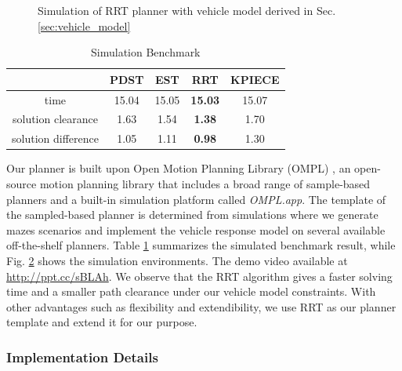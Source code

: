 \documentclass[../thesis.tex]{subfiles}
\begin{document}
\begin{figure}[t]
\begin{subfigure}[b]{0.3\linewidth}
           	\subcaption{}
           	\label{fig:rrt-sim-maze2}
    	\end{subfigure}
    	\caption{Simulation of RRT planner with vehicle model derived in Sec. \ref{sec:vehicle_model}}
	\label{fig:rrt-sim-maze}
\end{figure}
 
 
\begin{table}[t]
    	\centering
    	\caption{Simulation Benchmark}
    	\label{table:simulation-benchmark}
    	\begin{small}
    	\begin{sc}
    	\begin{tabular}{ccccc}
           	\toprule
                   	& PDST \cite{ladd2005motion} & EST \cite{hsu1997path} & RRT \cite{kuffner2000rrt} & KPIECE \cite{csucan2009kinodynamic} \\
           	\midrule \midrule
           	time & 15.04 & 15.05 & \textbf{15.03} & 15.07 \\
           	solution clearance & 1.63 & 1.54 & \textbf{1.38} & 1.70 \\
           	solution difference & 1.05 & 1.11 & \textbf{0.98} & 1.30 \\
           	\toprule
    	\end{tabular}
    	\end{sc}
    	\end{small}
\end{table}
 
Our planner is built upon Open Motion Planning Library (OMPL) \cite{sucan2012the-open-motion-planning-library}, an open-source motion planning library that includes a broad range of sample-based planners and a built-in simulation platform called \textit{OMPL.app}.
The template of the sampled-based planner is determined from simulations where we generate mazes scenarios and implement the vehicle response model on several available off-the-shelf planners. 
Table \ref{table:simulation-benchmark} summarizes the simulated benchmark result, while Fig. \ref{fig:rrt-sim-maze} shows the simulation environments. 
The demo video available at \url{http://ppt.cc/sBLAh}. 
We observe that the RRT algorithm gives a faster solving time and a smaller path clearance under our vehicle model constraints.
With other advantages such as flexibility and extendibility, we use RRT as our planner template and extend it for our purpose.
 
 
\subsubsection{Implementation Details}
 
\end{document}
